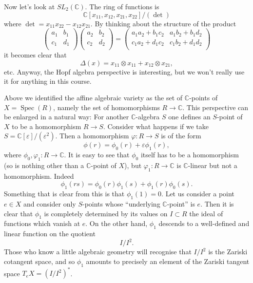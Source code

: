 \documentclass[12pt]{article}
\theoremstyle{plain}
\theoremstyle{definition}
\numberwithin{equation}{section}
\DeclareMathOperator{\spec}{Spec}
\newcommand{\C}{\mathbb{C}}
\begin{document}
Now let's look at $SL_2(\C)$. The ring of functions is
\[
\C[x_{11}, x_{12}, x_{21}, x_{22}] / (\det)
\]
where $\det = x_{11} x_{22} - x_{12} x_{21}$. By thinking about the structure of the product
\[
\left(\begin{array}{cc}
a_1 & b_1 \\ c_1 & d_1 \\
\end{array}
\right)
\left(\begin{array}{cc}
a_2 & b_2 \\ c_2 & d_2 \\
\end{array}
\right) =
\left(\begin{array}{cc}
a_1 a_2 + b_1 c_2 & a_1 b_2 + b_1 d_2 \\ c_1 a_2 + d_1 c_2 & c_1 b_2 + d_1 d_2 \\
\end{array}
\right)
\]
it becomes clear that
\[
\Delta(x) = x_{11} \otimes x_{11} + x_{12} \otimes x_{21},
\]
etc. Anyway, the Hopf algebra perspective is interesting, but we won't really use it for anything in this course.






Above we identified the affine algebraic variety as the set of $\C$-points of $X = \spec(R)$, namely the set of homomorphisms $R \rightarrow \C$. This perspective can be enlarged in a natural way: For another $\C$-algebra $S$ one defines an $S$-point of $X$ to be a homomorphism $R \rightarrow S$. Consider what happens if we take $S = \C[\varepsilon] / (\varepsilon^2)$. Then a homomorphism $\varphi : R \rightarrow S$ is of the form
\[
\phi(r) = \phi_0(r) + \varepsilon \phi_1(r),
\]
where $\phi_0, \varphi_1 : R \rightarrow \C$. It is easy to see that $\phi_0$ itself has to be a homomorphism (so is nothing other than a $\C$-point of $X$), but $\varphi_1 : R \rightarrow \C$ is $\C$-linear but not a homomorphism. Indeed
\[
\phi_1(rs) = \phi_0(r)\phi_1(s) + \phi_1(r)\phi_0(s).
\]
Something that is clear from this is that $\phi_1(1) = 0$. Let us consider a point $e \in X$ and consider only $S$-points whose ``underlying $\C$-point'' is $e$. Then it is clear that $\phi_1$ is completely determined by its values on $I \subset R$ the ideal of functions which vanish at $e$. On the other hand, $\phi_1$ descends to a well-defined and linear function on the quotient
\[
I / I^2.
\]
Those who know a little algebraic geometry will recognise that $I / I^2$ is the Zariski cotangent space, and so $\phi_1$ amounts to precisely an element of the Zariski tangent space $T_eX = (I / I^2)^*$.
\end{document}
